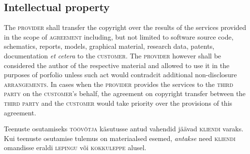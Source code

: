 \begin{Form}
\begin{paracol}{3}
{        \subsection{Intellectual property}
        The \textsc{provider} shall transfer the copyright over the results of the services provided in the scope of \textsc{agreement} including, but not limited to software source code, schematics, reports, models, graphical material, research data, patents, documentation \emph{et ce\-te\-ra} to the \textsc{customer}. The \textsc{provider} however shall be considered the author of the respective material and allowed to use it in the purposes of porfolio unless such act would contradcit additional non-disclosure \textsc{arrangements}. In cases when the \textsc{provider} provides the services to the \textsc{third party} on the \textsc{customer}'s behalf, the agreement on copyright transfer between the \textsc{third party} and the \textsc{customer} would take priority over the provisions of this agreement.}
        {Teenuste osutamiseks \textsc{töövõtja} käsutusse antud vahendid jäävad \textsc{kliendi} varaks. Kui teenuste osutamise tulemus on materiaalsed esemed, \emph{antakse} need \textsc{kliendi} omandisse eraldi \textsc{lepingu} või \textsc{kokkuleppe} alusel.

}
\end{paracol}
\end{Form}
